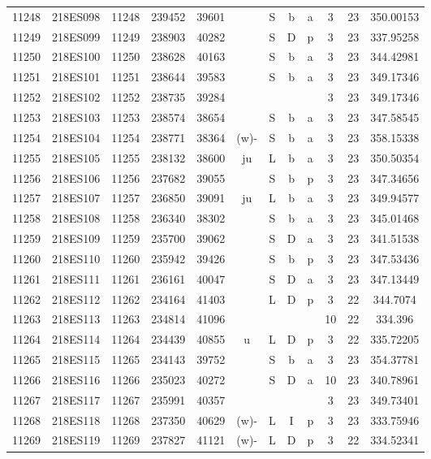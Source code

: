 \begin{tabular}{|*{12}{c|}}
11248 & 218ES098 & 11248 & 239452 & 39601 &  & S & b & a & 3 & 23 & 350.00153 \\ 
11249 & 218ES099 & 11249 & 238903 & 40282 &  & S & D & p & 3 & 23 & 337.95258 \\ 
11250 & 218ES100 & 11250 & 238628 & 40163 &  & S & b & a & 3 & 23 & 344.42981 \\ 
11251 & 218ES101 & 11251 & 238644 & 39583 &  & S & b & a & 3 & 23 & 349.17346 \\ 
11252 & 218ES102 & 11252 & 238735 & 39284 &  &  &  &  & 3 & 23 & 349.17346 \\ 
11253 & 218ES103 & 11253 & 238574 & 38654 &  & S & b & a & 3 & 23 & 347.58545 \\ 
11254 & 218ES104 & 11254 & 238771 & 38364 & (w)- & S & b & a & 3 & 23 & 358.15338 \\ 
11255 & 218ES105 & 11255 & 238132 & 38600 & ju & L & b & a & 3 & 23 & 350.50354 \\ 
11256 & 218ES106 & 11256 & 237682 & 39055 &  & S & b & p & 3 & 23 & 347.34656 \\ 
11257 & 218ES107 & 11257 & 236850 & 39091 & ju & L & b & a & 3 & 23 & 349.94577 \\ 
11258 & 218ES108 & 11258 & 236340 & 38302 &  & S & b & a & 3 & 23 & 345.01468 \\ 
11259 & 218ES109 & 11259 & 235700 & 39062 &  & S & D & a & 3 & 23 & 341.51538 \\ 
11260 & 218ES110 & 11260 & 235942 & 39426 &  & S & b & p & 3 & 23 & 347.53436 \\ 
11261 & 218ES111 & 11261 & 236161 & 40047 &  & S & D & a & 3 & 23 & 347.13449 \\ 
11262 & 218ES112 & 11262 & 234164 & 41403 &  & L & D & p & 3 & 22 & 344.7074 \\ 
11263 & 218ES113 & 11263 & 234814 & 41096 &  &  &  &  & 10 & 22 & 334.396 \\ 
11264 & 218ES114 & 11264 & 234439 & 40855 & u & L & D & p & 3 & 22 & 335.72205 \\ 
11265 & 218ES115 & 11265 & 234143 & 39752 &  & S & b & a & 3 & 23 & 354.37781 \\ 
11266 & 218ES116 & 11266 & 235023 & 40272 &  & S & D & a & 10 & 23 & 340.78961 \\ 
11267 & 218ES117 & 11267 & 235991 & 40357 &  &  &  &  & 3 & 23 & 349.73401 \\ 
11268 & 218ES118 & 11268 & 237350 & 40629 & (w)- & L & I & p & 3 & 23 & 333.75946 \\ 
11269 & 218ES119 & 11269 & 237827 & 41121 & (w)- & L & D & p & 3 & 22 & 334.52341 \\ 

\end{tabular}

